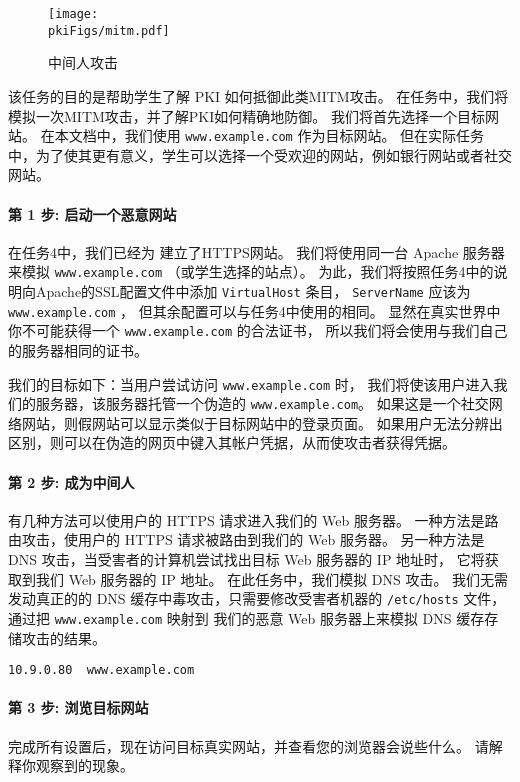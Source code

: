 \begin{figure}[htb]
   \begin{center}
      \texttt{[image: \\pkiFigs/mitm.pdf]}
   \end{center}
   \caption{中间人攻击}
   \label{pki:fig:mitm}
\end{figure}


该任务的目的是帮助学生了解 PKI 如何抵御此类MITM攻击。
在任务中，我们将模拟一次MITM攻击，并了解PKI如何精确地防御。
我们将首先选择一个目标网站。
在本文档中，我们使用 \texttt{www.example.com} 作为目标网站。
但在实际任务中，为了使其更有意义，学生可以选择一个受欢迎的网站，例如银行网站或者社交网站。


\paragraph{第 1 步: 启动一个恶意网站}
在任务4中，我们已经为 \pkiserver 建立了HTTPS网站。
我们将使用同一台 Apache 服务器来模拟 \texttt{www.example.com} （或学生选择的站点）。
为此，我们将按照任务4中的说明向Apache的SSL配置文件中添加 \texttt{VirtualHost} 条目，
\texttt{ServerName} 应该为 \texttt{www.example.com} ，
但其余配置可以与任务4中使用的相同。
显然在真实世界中你不可能获得一个 \texttt{www.example.com} 的合法证书，
所以我们将会使用与我们自己的服务器相同的证书。


我们的目标如下：当用户尝试访问 \texttt{www.example.com} 时，
我们将使该用户进入我们的服务器，该服务器托管一个伪造的 \texttt{www.example.com}。
如果这是一个社交网络网站，则假网站可以显示类似于目标网站中的登录页面。
如果用户无法分辨出区别，则可以在伪造的网页中键入其帐户凭据，从而使攻击者获得凭据。


\paragraph{第 2 步: 成为中间人}
有几种方法可以使用户的 HTTPS 请求进入我们的 Web 服务器。
一种方法是路由攻击，使用户的 HTTPS 请求被路由到我们的 Web 服务器。
另一种方法是 DNS 攻击，当受害者的计算机尝试找出目标 Web 服务器的 IP 地址时，
它将获取到我们 Web 服务器的 IP 地址。
在此任务中，我们模拟 DNS 攻击。
我们无需发动真正的的 DNS 缓存中毒攻击，只需要修改受害者机器的 \texttt{/etc/hosts} 文件，
通过把 \texttt{www.example.com} 映射到
我们的恶意 Web 服务器上来模拟 DNS 缓存存储攻击的结果。


\begin{lstlisting}
10.9.0.80  www.example.com
\end{lstlisting}


\paragraph{第 3 步: 浏览目标网站}
完成所有设置后，现在访问目标真实网站，并查看您的浏览器会说些什么。
请解释你观察到的现象。



